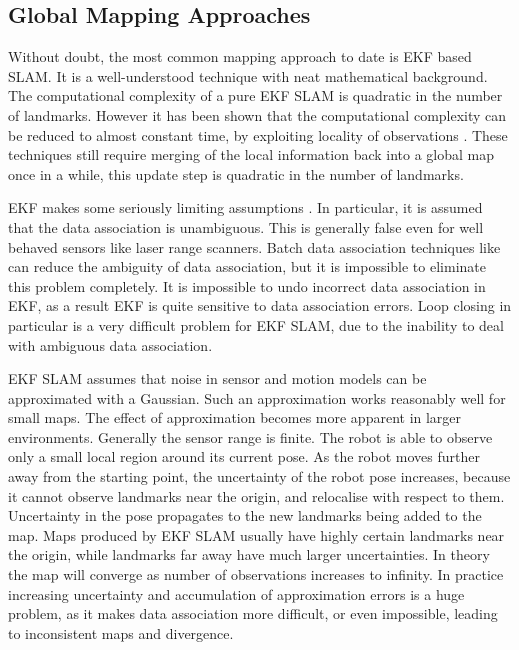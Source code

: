 \subsection{Global Mapping Approaches}


Without doubt, the most common mapping approach to date is EKF based
SLAM. It is a well-understood technique with neat mathematical
background. The computational complexity of a pure EKF SLAM is
quadratic in the number of landmarks. However it has been shown that
the computational complexity can be reduced to almost constant time,
by exploiting locality of observations \cite{Thrun03d,guivant03}.
These techniques still require merging of the local information back
into a global map once in a while, this update step is quadratic in
the number of landmarks.

EKF makes some seriously limiting assumptions \cite{fixme}. In
particular, it is assumed that the data association is
unambiguous. This is generally false even for well behaved sensors
like laser range scanners. Batch data association techniques like
\cite{neira01:_data_assoc_stoch_mappin_using,
tardos02:_mappin_local_indoor_envir_using_sonar_data} can reduce the
ambiguity of data association, but it is impossible to eliminate this
problem completely. It is impossible to undo incorrect data
association in EKF, as a result EKF is quite sensitive to data
association errors. Loop closing in particular is a very difficult
problem for EKF SLAM, due to the inability to deal with ambiguous data
association.

EKF SLAM assumes that noise in sensor and motion models can be
approximated with a Gaussian. Such an approximation works reasonably
well for small maps. The effect of approximation becomes more apparent
in larger environments. Generally the sensor range is finite. The
robot is able to observe only a small local region around its current
pose. As the robot moves further away from the starting point, the
uncertainty of the robot pose increases, because it cannot observe
landmarks near the origin, and relocalise with respect to
them. Uncertainty in the pose propagates to the new landmarks being
added to the map. Maps produced by EKF SLAM usually have highly
certain landmarks near the origin, while landmarks far away have much
larger uncertainties. In theory the map will converge as number of
observations increases to infinity.  In practice increasing uncertainty and accumulation of
approximation errors is a huge problem, as it makes data association
more difficult, or even impossible, leading to inconsistent maps and
divergence.


